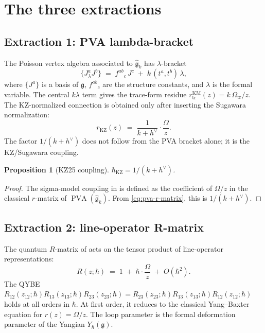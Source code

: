 \documentclass[11pt]{article}
\theoremstyle{plain}
\newtheorem{proposition}[theorem]{Proposition}
\theoremstyle{definition}
\theoremstyle{remark}
\newcommand{\fg}{\mathfrak{g}}
\numberwithin{equation}{section}
\begin{document}
\section{The three extractions}\label{sec:extractions}

\subsection{Extraction 1: PVA lambda-bracket}

The Poisson vertex algebra associated to $\widehat{\fg}_k$ has
$\lambda$-bracket
\begin{equation}\label{eq:pva-bracket}
 \{J^a_\lambda J^b\}
 \;=\;
 f^{ab}{}_c \, J^c
 \;+\;
 k \, (t^a, t^b) \, \lambda,
\end{equation}
where $\{J^a\}$ is a basis of $\fg$, $f^{ab}{}_c$ are the structure
constants, and $\lambda$ is the formal variable. The central
$k\lambda$ term gives the trace-form residue
$r^{\mathrm{KM}}_{\mathrm{tr}}(z)=k\,\Omega_{\mathrm{tr}}/z$.
The KZ-normalized connection is obtained only after inserting the
Sugawara normalization:
\begin{equation}\label{eq:pva-r-matrix}
 r_{\mathrm{KZ}}(z)
 \;=\;
 \frac{1}{k + h^\vee}
 \cdot \frac{\Omega}{z}.
\end{equation}
The factor $1/(k+h^\vee)$ does not follow from the PVA bracket alone;
it is the KZ/Sugawara coupling.

\begin{proposition}[KZ25 coupling]\label{prop:kz-coupling}
$\hbar_{\mathrm{KZ}} = 1/(k + h^\vee)$.
\end{proposition}

\begin{proof}
The sigma-model coupling in \cite{KZ25} is defined as the coefficient
of $\Omega/z$ in the classical $r$-matrix of
$\operatorname{PVA}(\widehat{\fg}_k)$. From
\eqref{eq:pva-r-matrix}, this is $1/(k + h^\vee)$.
\end{proof}

\subsection{Extraction 2: line-operator R-matrix}

The quantum $R$-matrix of \cite{DNP25} acts on the tensor product of
line-operator representations:
\begin{equation}\label{eq:dnp-r-matrix}
 R(z;\hbar)
 \;=\;
 1
 \;+\;
 \hbar \cdot \frac{\Omega}{z}
 \;+\;
 O(\hbar^2).
\end{equation}
The QYBE $R_{12}(z_{12};\hbar) R_{13}(z_{13};\hbar)
R_{23}(z_{23};\hbar) = R_{23}(z_{23};\hbar) R_{13}(z_{13};\hbar)
R_{12}(z_{12};\hbar)$ holds at all orders in $\hbar$. At first
order, it reduces to the classical Yang--Baxter equation for
$r(z) = \Omega/z$. The loop parameter is the formal deformation
parameter of the Yangian $Y_\hbar(\fg)$.
\end{document}
